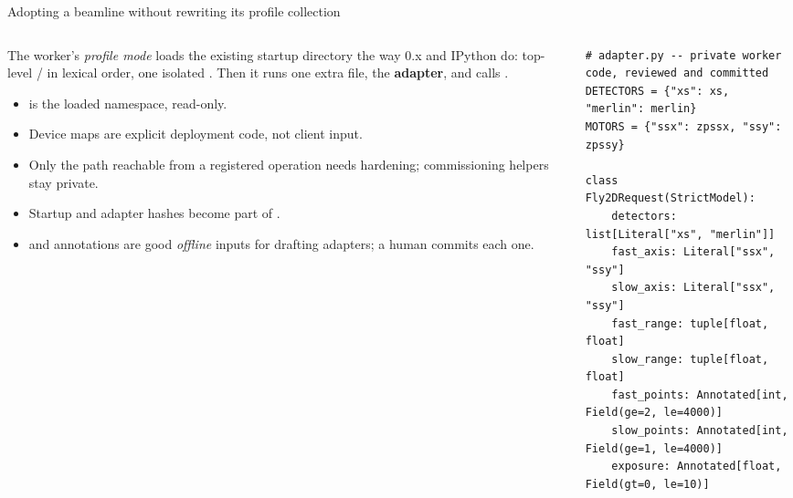\begin{frame}[fragile]{Adopting a beamline without rewriting its profile collection}
    \begin{columns}[T]
        \begin{column}{0.42\textwidth}
            \footnotesize
            The worker's \emph{profile mode} loads the existing startup directory the way 0.x and IPython do:
            top-level / in lexical order, one isolated .
            Then it runs one extra file, the \textbf{adapter}, and calls
            . 
            \begin{itemize}
                \item {} is the loaded namespace, read-only.
                \item Device maps are explicit deployment code, not client input.
                \item Only the path reachable from a registered operation needs hardening;
                      commissioning helpers stay private.
                \item Startup and adapter hashes become part of .
                \item {} and annotations are good \emph{offline} inputs
                      for drafting adapters; a human commits each one.
            \end{itemize}
        \end{column}
        \begin{column}{0.58\textwidth}
\begin{lstlisting}[style=python, aboveskip=0pt, belowskip=0pt, breaklines=false]
# adapter.py -- private worker code, reviewed and committed
DETECTORS = {"xs": xs, "merlin": merlin}
MOTORS = {"ssx": zpssx, "ssy": zpssy}

class Fly2DRequest(StrictModel):
    detectors: list[Literal["xs", "merlin"]]
    fast_axis: Literal["ssx", "ssy"]
    slow_axis: Literal["ssx", "ssy"]
    fast_range: tuple[float, float]
    slow_range: tuple[float, float]
    fast_points: Annotated[int, Field(ge=2, le=4000)]
    slow_points: Annotated[int, Field(ge=1, le=4000)]
    exposure: Annotated[float, Field(gt=0, le=10)]


\end{lstlisting}
\end{column}
\end{columns}
\end{frame}

